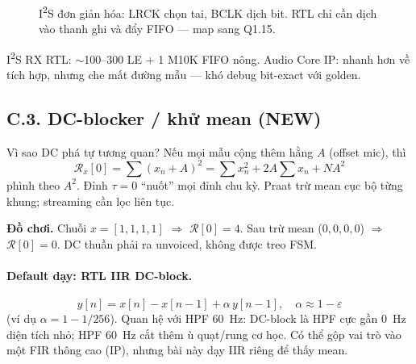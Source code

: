\begin{figure}[H]
\centering
{}
\caption{I\textsuperscript{2}S đơn giản hóa: LRCK chọn tai, BCLK dịch bit. RTL chỉ cần dịch vào thanh ghi và đẩy FIFO --- map sang Q1.15.}
\label{fig:i2s_timing}
\end{figure}

\begin{costbox}
I\textsuperscript{2}S RX RTL: $\sim$100--300 LE + 1 M10K FIFO nông. Audio Core IP: nhanh hơn về tích hợp, nhưng che mất đường mẫu --- khó debug bit-exact với golden.
\end{costbox}

\subsection*{C.3. DC-blocker / khử mean (NEW)}

\begin{firstprin}{Vì sao DC phá tự tương quan?}
Nếu mọi mẫu cộng thêm hằng $A$ (offset mic), thì
\[
\mathcal{R}_x[0] = \sum (x_n+A)^2 = \sum x_n^2 + 2A\sum x_n + NA^2
\]
phình theo $A^2$. Đỉnh $\tau=0$ ``nuốt'' mọi đỉnh chu kỳ. Praat trừ mean cục bộ từng khung; streaming cần lọc liên tục.
\end{firstprin}

\noindent\textbf{Đồ chơi.} Chuỗi $x=[1,1,1,1]$ $\Rightarrow$ $\mathcal{R}[0]=4$. Sau trừ mean ($0,0,0,0$) $\Rightarrow$ $\mathcal{R}[0]=0$. DC thuần phải ra unvoiced, không được treo FSM.

\paragraph{Default dạy: RTL IIR DC-block.}
\[
y[n] = x[n] - x[n-1] + \alpha\, y[n-1], \quad \alpha \approx 1-\varepsilon
\]
(ví dụ $\alpha=1-1/256$). Quan hệ với HPF 60~Hz: DC-block là HPF cực gần 0~Hz diện tích nhỏ; HPF 60~Hz cắt thêm ù quạt/rung cơ học. Có thể gộp vai trò vào một FIR thông cao (IP), nhưng bài này dạy IIR riêng để thấy mean.

